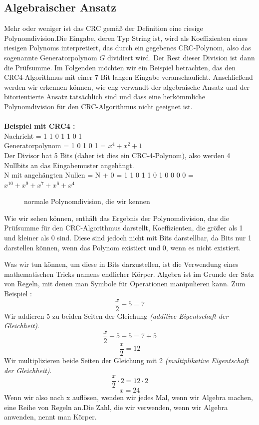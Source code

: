 \documentclass[course=erap]{aspdoc}
\begin{document}
\subsection{Algebraischer Ansatz}
Mehr oder weniger ist das CRC gemäß der Definition eine riesige Polynomdivision.Die Eingabe, deren Typ String ist,  wird als Koeffizienten eines riesigen Polynoms interpretiert, das durch ein gegebenes CRC-Polynom, also das sogenannte Generatorpolynom $G$ dividiert wird. Der Rest dieser Division ist dann die Prüfsumme. Im Folgenden möchten wir ein Beispiel betrachten, das den CRC4-Algorithmus mit einer 7 Bit langen Eingabe veranschaulicht. Anschließend werden wir erkennen können, wie eng verwandt der algebraische Ansatz und der bitorientierte Ansatz tatsächlich sind und dass eine herkömmliche Polynomdivision für den CRC-Algorithmus nicht geeignet ist.\\
\\
\textbf{Beispiel mit CRC4 :} \\
Nachricht = 1 1 0 1 1 0 1 \\
Generatorpolynom = 1 0 1 0 1 = $x^4+x^2+1$ \\ 
Der Divisor hat 5 Bits (daher ist dies ein CRC-4-Polynom), also werden 4 Nullbits an das Eingabemuster angehängt.\\
N mit angehängten Nullen = N + 0 = 1 1 0 1 1 0 1 0 0 0 0 = $x^{10}+x^9+x^7+x^6+x^4$\\
\begin{figure}[H]
    \centering
      \begin{tcolorbox}[colback=gray!10, colframe=gray!50, arc=5pt, fontupper=\tiny, width=10cm]
    \end{tcolorbox}
    \caption{normale Polynomdivision, die wir kennen}
\end{figure}
    Wie wir sehen können, enthält das Ergebnis der Polynomdivision, das die Prüfsumme für den CRC-Algorithmus darstellt, Koeffizienten, die größer als 1 und kleiner als 0 sind. Diese sind jedoch nicht mit Bits darstellbar, da Bits nur 1 darstellen können, wenn das Polynom existiert und 0, wenn es nicht existiert.

    Was wir tun können, um diese in Bits darzustellen, ist die Verwendung eines mathematischen Tricks namens endlicher Körper. Algebra ist im Grunde der Satz von Regeln, mit denen man Symbole für Operationen manipulieren kann. Zum Beispiel :
\[ \frac{x}{2} - 5 = 7 \]
Wir addieren 5 zu beiden Seiten der Gleichung \textit{(additive Eigentschaft der Gleichheit)}.
\[ \frac{x}{2} - 5 + 5 = 7 + 5\]
\[\frac{x}{2} = 12\]
Wir multiplizieren beide Seiten der Gleichung mit 2 \textit{(multiplikative Eigentschaft der Gleichheit)}.
\[\frac{x}{2} \cdot2 = 12 \cdot2\]
\[x = 24\]
    Wenn wir also nach x auflösen, wenden wir jedes Mal, wenn wir Algebra machen, eine Reihe von Regeln an.Die Zahl, die wir verwenden, wenn wir Algebra anwenden, nennt man Körper.
    
\end{document}
